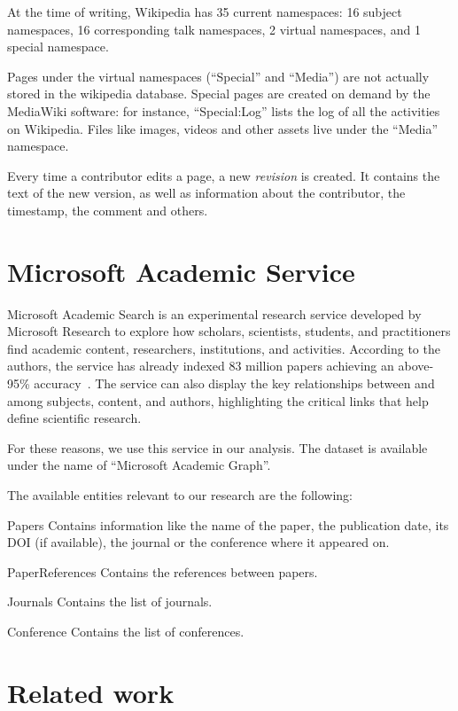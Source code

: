 At the time of writing, Wikipedia has 35 current namespaces: 16 subject namespaces, 16 corresponding talk namespaces, 2 virtual namespaces, and 1 special namespace.

Pages under the virtual namespaces (``Special'' and ``Media'') are not actually stored in the wikipedia database.
Special pages are created on demand by the MediaWiki software: for instance, ``Special:Log'' lists the log of all the activities on Wikipedia.
Files like images, videos and other assets live under the ``Media'' namespace.

Every time a contributor edits a page, a new \emph{revision} is created.
It contains the text of the new version, as well as information about the contributor, the timestamp, the comment and others.

\section{Microsoft Academic Service}
\label{sec:mag}
Microsoft Academic Search is an experimental research service developed by Microsoft Research to explore how scholars, scientists, students, and practitioners find academic content, researchers, institutions, and activities.
According to the authors, the service has already indexed 83 million papers achieving an above-95\% accuracy~\cite{Sinha2015}.
The service can also display the key relationships between and among subjects, content, and authors, highlighting the critical links that help define scientific research.

For these reasons, we use this service in our analysis.
The dataset is available under the name of ``Microsoft Academic Graph''.

The available entities relevant to our research are the following:
\begin{description*}
    \item[Papers] Contains information like the name of the paper, the publication date, its \ac{DOI} (if available), the journal or the conference where it appeared on.
    \item[PaperReferences] Contains the references between papers.
    \item[Journals] Contains the list of journals.
    \item[Conference] Contains the list of conferences.
\end{description*}



\section{Related work}
\label{sec:relatedwork}
